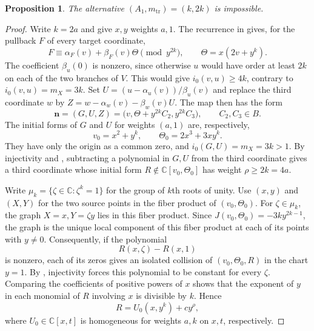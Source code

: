 \documentclass[11pt,letterpaper]{article}
\numberwithin{equation}{section}
\newtheorem{proposition}[proposition]{Proposition}
\theoremstyle{remark}
\theoremstyle{plain}
\newcommand{\C}{\mathbb{C}}
\begin{document}
\begin{proposition}
\label{prop:d2-second-alternative}
The alternative $(A_1,m_{\mathrm{tr}})=(k,2k)$ is impossible.
\end{proposition}

\begin{proof}
Write $k=2a$ and give $x,y$ weights $a,1$.
The recurrence in  gives, for the pullback $F$ of every target coordinate,
\[
 F\equiv\alpha_F(v)+\beta_F(v)\Theta\pmod{y^{2k}},
 \qquad \Theta=x(2v+y^k).
\]
The coefficient $\beta_u(0)$ is nonzero, since otherwise $u$ would have order
at least $2k$ on each of the two branches of $V$.
This would give $i_0(v,u)\geq4k$, contrary to $i_0(v,u)=m_X=3k$.
Set $U=(u-\alpha_u(v))/\beta_u(v)$ and replace the third coordinate
$w$ by $Z=w-\alpha_w(v)-\beta_w(v)U$.  The map then has the form
\[
 \boldsymbol n=(G,U,Z)
 =\bigl(v,\Theta+y^{2k}C_2,y^{2k}C_3\bigr),
 \qquad C_2,C_3\in B.
\]
The initial forms of $G$ and $U$ for weights $(a,1)$ are, respectively,
\[
 v_0=x^2+y^k,\qquad \Theta_0=2x^3+3xy^k.
\]
They have only the origin as a common zero, and $i_0(G,U)=m_X=3k>1$.
By injectivity and , subtracting a polynomial
in $G,U$ from the third coordinate gives a third coordinate whose initial form
$R\notin\C[v_0,\Theta_0]$ has weight $\rho\geq2k=4a$.

Write $\mu_k=\{\zeta\in\C:\zeta^k=1\}$ for the group of $k$th
roots of unity.  Use $(x,y)$ and $(X,Y)$ for the two source points in the
fiber product of $(v_0,\Theta_0)$.  For $\zeta\in\mu_k$, the graph $X=x,Y=\zeta y$
lies in this fiber product.  Since
$J(v_0,\Theta_0)=-3ky^{2k-1}$, the graph is the unique local component
of this fiber product at each of its points with $y\neq0$.
Consequently, if the polynomial
\[
 R(x,\zeta)-R(x,1)
\]
is nonzero, each of its zeros gives an isolated collision
of $(v_0,\Theta_0,R)$ in the chart $y=1$.
By , injectivity forces this polynomial to
be constant for every $\zeta$.  Comparing the coefficients of
positive powers of $x$ shows that the exponent of $y$ in each monomial
of $R$ involving $x$ is divisible by $k$.  Hence
\begin{equation}
 R=U_0(x,y^k)+cy^\rho,                              \label{eq:d2-fourier}
\end{equation}
where $U_0\in\C[x,t]$ is homogeneous for weights $a,k$ on $x,t$, respectively.


\end{proof}
\end{document}
